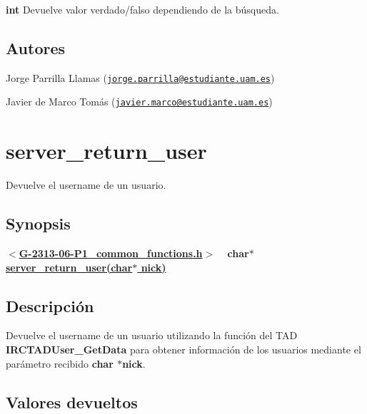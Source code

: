 \begin{DoxyItemize}
\item {\bfseries int} Devuelve valor verdado/falso dependiendo de la búsqueda. 
\end{DoxyItemize}\hypertarget{server_channels_update_away_authors_server_channels_update_away}{}\subsection{Autores}\label{server_channels_update_away_authors_server_channels_update_away}

\begin{DoxyItemize}
\item Jorge Parrilla Llamas (\href{mailto:jorge.parrilla@estudiante.uam.es}{\tt jorge.\+parrilla@estudiante.\+uam.\+es}) 
\item Javier de Marco Tomás (\href{mailto:javier.marco@estudiante.uam.es}{\tt javier.\+marco@estudiante.\+uam.\+es}) 
\end{DoxyItemize}\hypertarget{server_return_user}{}\section{server\+\_\+return\+\_\+user}\label{server_return_user}
Devuelve el username de un usuario.\hypertarget{server_return_user_synopsis_server_return_user}{}\subsection{Synopsis}\label{server_return_user_synopsis_server_return_user}
{ {\bfseries $<$\hyperlink{G-2313-06-P1__common__functions_8h}{G-\/2313-\/06-\/\+P1\+\_\+common\+\_\+functions.\+h}$>$} ~\newline
 {\bfseries char$\ast$ \hyperlink{G-2313-06-P1__common__functions_8c_a230bf24ab7ae18d2e81ebc1d3575a6ad}{server\+\_\+return\+\_\+user(char$\ast$ nick)}} } \hypertarget{server_return_user_descripcion_server_return_user}{}\subsection{Descripción}\label{server_return_user_descripcion_server_return_user}
Devuelve el username de un usuario utilizando la función del T\+A\+D {\bfseries I\+R\+C\+T\+A\+D\+User\+\_\+\+Get\+Data} para obtener información de los usuarios mediante el parámetro recibido {\bfseries char $\ast$nick}. \hypertarget{server_return_user_return_server_return_user}{}\subsection{Valores devueltos}\label{server_return_user_return_server_return_user}

